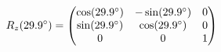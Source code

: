 \documentclass[preview]{standalone}
\begin{document}
\begin{align*}
\special{dvisvgm:raw <g id='unique000'>}R_z(29.9^\circ) = \begin{pmatrix} \cos(29.9^\circ) & -\sin(29.9^\circ) & 0 \\ \sin(29.9^\circ) & \cos(29.9^\circ) & 0 \\ 0 & 0 & 1 \end{pmatrix}\special{dvisvgm:raw </g>}
\end{align*}
\end{document}
